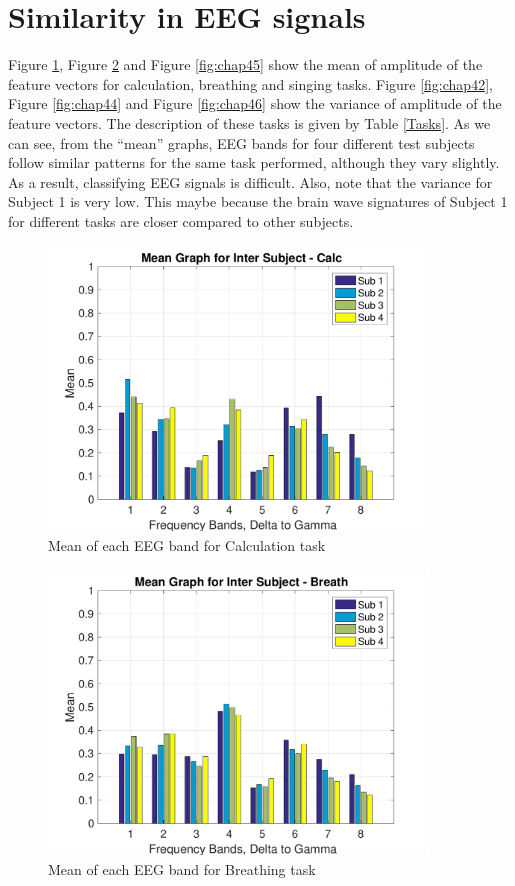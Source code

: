         \section{Similarity in EEG signals}
        Figure \ref{fig:chap41}, Figure \ref{fig:chap43} and Figure \ref{fig:chap45} show the mean of amplitude of the feature vectors for calculation, breathing and singing tasks. Figure \ref{fig:chap42}, Figure \ref{fig:chap44} and Figure \ref{fig:chap46} show the variance of amplitude of the feature vectors. The description of these tasks is given by Table \ref{Tasks}. As we can see, from the ``mean'' graphs, EEG bands for four different test subjects follow similar patterns for the same task performed, although they vary slightly. As a result, classifying EEG signals is difficult. Also, note that the variance for Subject 1 is very low. This maybe because the brain wave signatures of Subject 1 for different tasks are closer compared to other subjects. 
        
	\begin{figure}[hbtp]
    	\centering
    	\includegraphics[width=0.9\textwidth]{Chapter-4/1}
    	\caption{Mean of each EEG band for Calculation task}
    	\label{fig:chap41}
    \end{figure}

    \begin{figure}[hbtp]
    	\centering
    	\includegraphics[width=0.9\textwidth]{Chapter-4/3}
    	\caption{Mean of each EEG band for Breathing task}
    	\label{fig:chap43}
    \end{figure}

